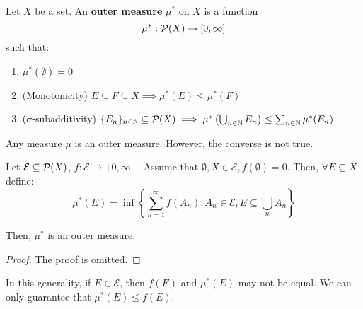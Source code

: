 \begin{fdefinition}
    Let $X$ be a set. An \textbf{outer measure} $\mu^{*}$ on $X$ is a function
    $$\mu^{*}: \mathcal{P}(X) \to [0, \infty]$$
    such that:
    \vspace{1em}
    \begin{enumerate}
        \item $\mu^{*}(\emptyset) = 0$
        \vspace{1em}
        \item (Monotonicity) $E \subseteq F \subseteq X \implies \mu^{*}(E) \leq \mu^{*}(F)$
        \vspace{1em}
        \item ($\sigma$-subadditivity) $\{E_n\}_{n \in \mathbb{N}} \subseteq \mathcal{P}(X) \implies \mu^{*}\left( \bigcup_{n \in \mathbb{N}} E_n \right) \leq \sum_{n \in \mathbb{N}} \mu^{*}(E_n)$
    \end{enumerate}
\end{fdefinition}

\vspace{1em}

\begin{fremark}
    Any measure $\mu$ is an outer measure. However, the converse is not true.
\end{fremark}

\vspace{1em}

\begin{fproposition}
    Let $\mathcal{E} \subseteq \mathcal{P}(X)$, $f: \mathcal{E} \to [0, \infty]$. Assume that 
    $\emptyset, X \in \mathcal{E}, f(\emptyset) = 0$. Then, $\forall E \subseteq X$ define:
    $$\mu^{*}(E) = \inf \left\{ \sum_{n=1}^{\infty} f(A_n): A_n \in \mathcal{E}, E \subseteq \bigcup_{n} A_n \right\}$$

    Then, $\mu^{*}$ is an outer measure.

\end{fproposition}

\begin{proof}
    The proof is omitted.

\end{proof}

\begin{fremark}
    In this generality, if $E \in \mathcal{E}$, then $f(E)$ and $\mu^{*}(E)$ may not be equal.
    We can only guarantee that $\mu^{*}(E) \leq f(E)$.
\end{fremark}

\vspace{1em}

